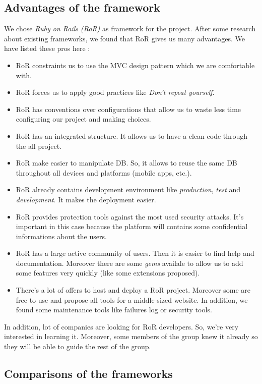 \subsection*{Advantages of the framework}

We chose \emph{Ruby on Rails (RoR)} as framework for the project. After some research about existing frameworks, we found that RoR gives us many advantages. We have listed these pros here :

\begin{itemize}
   \item RoR constraints us to use the MVC design pattern which we are comfortable with.
   \item RoR forces us to apply good practices like \emph{Don't repeat yourself}.
   \item RoR has conventions over configurations that allow us to waste less time configuring our project and making choices.
   \item RoR has an integrated structure. It allows us to have a clean code through the all project.
   \item RoR make easier to manipulate DB. So, it allows to reuse the same DB throughout all devices and platforms (mobile apps, etc.).
   \item RoR already contains development environment like \emph{production}, \emph{test} and \emph{development}. It makes the deployment easier.
   \item RoR provides protection tools against the most used security attacks. It's important in this case because the platform will contains some confidential informations about the users.
   \item RoR has a large active community of users. Then it is easier to find help and documentation. Moreover there
   are some \emph{gems} availale to allow us to add some features very quickly (like some extensions proposed). 
   \item There's a lot of offers to host and deploy a RoR project. Moreover some are free to use and 
   propose all tools for a middle-sized website.  In addition, we found some maintenance tools like failures log or security tools.
\end{itemize}

In addition, lot of companies are looking for RoR developers. So, we're very interested in learning it. Moreover, 
some members of the group knew it already so they will be able to guide the rest of the group.

\subsection*{Comparisons of the frameworks}

